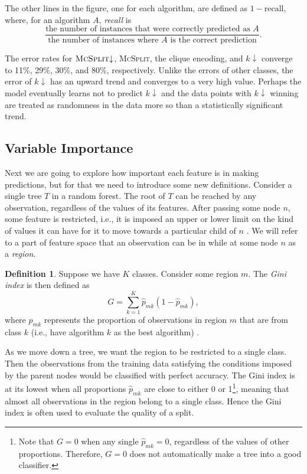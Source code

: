 \documentclass{l4proj}
\theoremstyle{definition}
\newtheorem{definition}{Definition}[chapter]
\theoremstyle{remark}
\begin{document}
The other lines in the figure, one for each algorithm, are defined as $1 -
\text{recall}$, where, for an algorithm $A$, \emph{recall}
\cite{citeulike:12882259} is
\[ \frac{\text{the number of instances that were correctly predicted as
      $A$}}{\text{the number of instances where $A$ is the correct
      prediction}}. \]

The error rates for $\textsc{McSplit}{\downarrow}$, \textsc{McSplit}, the clique
encoding, and $k{\downarrow}$ converge to 11\%, 29\%, 30\%, and 80\%,
respectively. Unlike the errors of other classes, the error of $k{\downarrow}$ has
an upward trend and converges to a very high value. Perhaps the model eventually
learns not to predict $k{\downarrow}$ and the data points with $k{\downarrow}$
winning are treated as randomness in the data more so than a statistically
significant trend.

\subsection{Variable Importance}

Next we are going to explore how important each feature is in making
predictions, but for that we need to introduce some new definitions. Consider a
single tree $T$ in a random forest. The root of $T$ can be reached by any
observation, regardless of the values of its features. After passing some node
$n$, some feature is restricted, i.e., it is imposed an upper or lower limit on
the kind of values it can have for it to move towards a particular child of $n$
\cite{James:2014:ISL:2517747}. We will refer to a part of feature space that an
observation can be in while at some node $n$ as a \emph{region}.

\begin{definition}
  Suppose we have $K$ classes. Consider some region $m$. The \emph{Gini index}
  is then defined as
  \[ G = \sum_{k=1}^K \hat{p}_{mk}(1-\hat{p}_{mk}), \]
  where $\hat{p}_{mk}$ represents the proportion of observations in region $m$
  that are from class $k$ (i.e., have algorithm $k$ as the best algorithm)
  \cite{James:2014:ISL:2517747}.
\end{definition}
As we move down a tree, we want the region to be restricted to a single class.
Then the observations from the training data satisfying the conditions imposed
by the parent nodes would be classified with perfect accuracy. The Gini index is
at its lowest when all proportions $\hat{p}_{mk}$ are close to either 0 or
1\footnote{Note that $G=0$ when any single $\hat{p}_{mk}=0$, regardless of the
  values of other proportions. Therefore, $G=0$ does not automatically make a
  tree into a good classifier.}, meaning that almost all observations in the
region belong to a single class. Hence the Gini index is often used to evaluate
the quality of a split.
\end{document}

